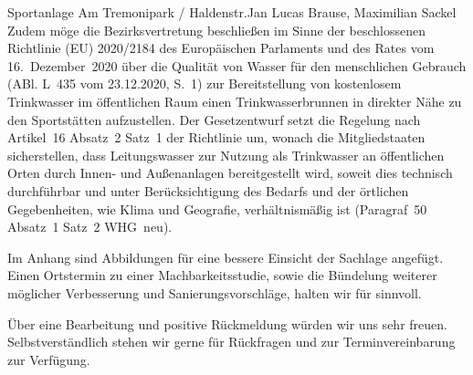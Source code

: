 \documentclass{../../templates/amendment}
\begin{document}
\begin{boxed}{Sportanlage Am Tremonipark / Haldenstr.}{Jan Lucas Brause, Maximilian Sackel}
    Zudem möge die Bezirksvertretung beschließen im Sinne der beschlossenen Richtlinie (EU) 2020/2184 des Europäischen Parlaments und des Rates vom 16.~Dezember~2020 über die Qualität von Wasser für den menschlichen Gebrauch (ABl. L~435 vom 23.12.2020, S.~1) zur Bereitstellung von kostenlosem Trinkwasser im öffentlichen Raum einen Trinkwasserbrunnen in direkter Nähe zu den Sportstätten aufzustellen.
    Der Gesetzentwurf setzt die Regelung nach Artikel~16 Absatz~2 Satz~1 der Richtlinie um, wonach die Mitgliedstaaten sicherstellen, dass Leitungswasser zur Nutzung als Trinkwasser an öffentlichen Orten durch Innen- und Außenanlagen bereitgestellt wird, soweit dies technisch durchführbar und unter Berücksichtigung des Bedarfs und der örtlichen Gegebenheiten, wie Klima und Geografie, verhältnismäßig ist (Paragraf~50 Absatz~1 Satz~2 WHG~neu).

    \pagebreak
    Im Anhang sind Abbildungen für eine bessere Einsicht der Sachlage angefügt.
    Einen Ortstermin zu einer Machbarkeitsstudie, sowie die Bündelung weiterer möglicher Verbesserung und Sanierungsvorschläge, halten wir für sinnvoll.

    Über eine Bearbeitung und positive Rückmeldung würden wir uns sehr freuen.
    Selbstverständlich stehen wir gerne für Rückfragen und zur Terminvereinbarung zur Verfügung.


\end{boxed}
\end{document}
